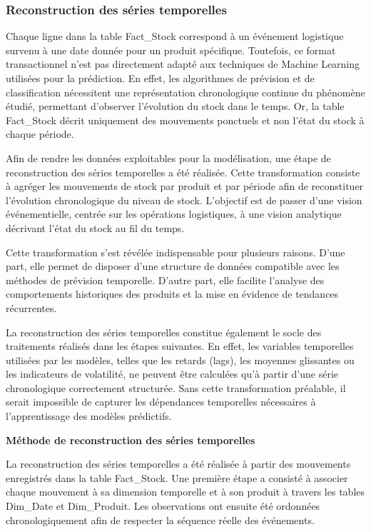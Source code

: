 \subsubsection{Reconstruction des séries temporelles}
 
Chaque ligne dans la table Fact\_Stock correspond à un événement logistique survenu à une date donnée pour un produit spécifique. Toutefois, ce format transactionnel n'est pas directement adapté aux techniques de Machine Learning utilisées pour la prédiction. En effet, les algorithmes de prévision et de classification nécessitent une représentation chronologique continue du phénomène étudié, permettant d'observer l'évolution du stock dans le temps. Or, la table Fact\_Stock décrit uniquement des mouvements ponctuels et non l'état du stock à chaque période.
 
Afin de rendre les données exploitables pour la modélisation, une étape de reconstruction des séries temporelles a été réalisée. Cette transformation consiste à agréger les mouvements de stock par produit et par période afin de reconstituer l'évolution chronologique du niveau de stock. L'objectif est de passer d'une vision événementielle, centrée sur les opérations logistiques, à une vision analytique décrivant l'état du stock au fil du temps.
 
Cette transformation s'est révélée indispensable pour plusieurs raisons. D'une part, elle permet de disposer d'une structure de données compatible avec les méthodes de prévision temporelle. D'autre part, elle facilite l'analyse des comportements historiques des produits et la mise en évidence de tendances récurrentes.
 
La reconstruction des séries temporelles constitue également le socle des traitements réalisés dans les étapes suivantes. En effet, les variables temporelles utilisées par les modèles, telles que les retards (lags), les moyennes glissantes ou les indicateurs de volatilité, ne peuvent être calculées qu'à partir d'une série chronologique correctement structurée. Sans cette transformation préalable, il serait impossible de capturer les dépendances temporelles nécessaires à l'apprentissage des modèles prédictifs.
 
\medskip
\noindent\textbf{Méthode de reconstruction des séries temporelles}\
 
La reconstruction des séries temporelles a été réalisée à partir des mouvements enregistrés dans la table Fact\_Stock. Une première étape a consisté à associer chaque mouvement à sa dimension temporelle et à son produit à travers les tables Dim\_Date et Dim\_Produit. Les observations ont ensuite été ordonnées chronologiquement afin de respecter la séquence réelle des événements.
 
